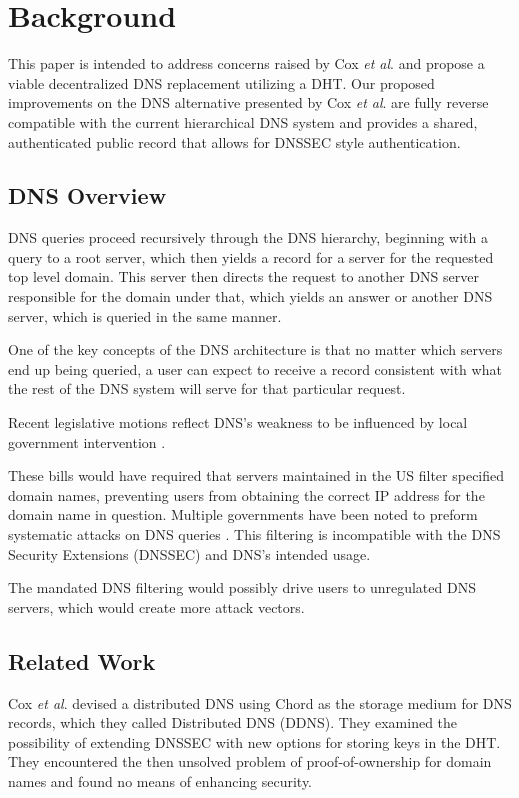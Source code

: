 \documentclass[11pt]{IEEEtran} %
\begin{document}
\section{Background}

This paper is intended to address concerns raised by Cox \textit{et al}. \cite{cox} and propose a viable decentralized DNS replacement utilizing a DHT. Our proposed improvements on the DNS alternative presented by Cox \textit{et al}. are fully reverse compatible with the current hierarchical DNS system and provides a shared, authenticated public record that allows for DNSSEC style authentication.

\subsection{DNS Overview}

DNS queries proceed recursively through the DNS hierarchy, beginning with a query to a root server, which then yields a record for a server for the requested top level domain.  This server then directs the request to another DNS server responsible for the domain under that, which yields an answer or another DNS server, which is queried in the same manner.

One of the key concepts of the DNS architecture is that no matter which servers end up being queried, a user can expect to receive a record consistent with what the rest of the DNS system will serve for that particular request.

Recent legislative motions reflect DNS's weakness to be influenced by local government intervention \cite{sopa} \cite{lemley2011don} \cite{crocker2011security}.

These bills would have required that servers maintained in the US filter specified domain names, preventing users from obtaining the correct IP address for the domain name in question. Multiple governments have been noted to preform systematic attacks on DNS queries \cite{inject}. This filtering is incompatible with the DNS Security Extensions (DNSSEC) \cite{crocker2011security} and DNS's intended usage. 

The mandated DNS filtering would possibly drive users to unregulated DNS servers, which would create more attack vectors.


\subsection{Related Work}
Cox \textit{et al}. devised a distributed DNS using Chord \cite{chord} as the storage medium for DNS records, which they called Distributed DNS (DDNS). They examined the possibility of extending DNSSEC with new options for storing keys in the DHT. They encountered the then unsolved problem of proof-of-ownership \cite{bitcoin} for domain names and found no means of enhancing security. 
\end{document}
